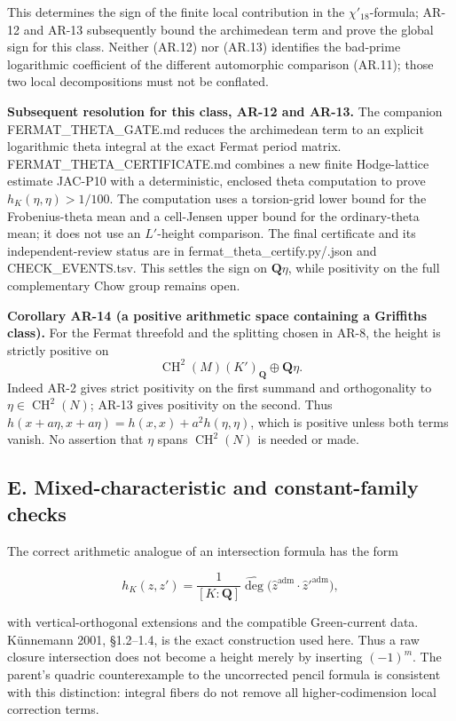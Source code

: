 \documentclass[11pt,a4paper]{article}
\begin{document}
This determines the sign of the finite local contribution in the
\(\chi'_{18}\)-formula; AR-12 and AR-13 subsequently bound the
archimedean term and prove the global sign for this class. Neither
(AR.12) nor (AR.13) identifies the bad-prime logarithmic coefficient of
the different automorphic comparison (AR.11); those two local
decompositions must not be conflated.

\textbf{Subsequent resolution for this class, AR-12 and AR-13.} The
companion FERMAT\_THETA\_GATE.md reduces the archimedean term to an
explicit logarithmic theta integral at the exact Fermat period matrix.
FERMAT\_THETA\_CERTIFICATE.md combines a new finite Hodge-lattice
estimate JAC-P10 with a deterministic, enclosed theta computation to
prove \(h_K(\eta,\eta)>1/100\). The computation uses a torsion-grid
lower bound for the Frobenius-theta mean and a cell-Jensen upper bound
for the ordinary-theta mean; it does not use an \(L'\)-height
comparison. The final certificate and its independent-review status are
in fermat\_theta\_certify.py/.json and CHECK\_EVENTS.tsv. This settles
the sign on \(\mathbf Q\eta\), while positivity on the full
complementary Chow group remains open.

\textbf{Corollary AR-14 (a positive arithmetic space containing a
Griffiths class).} For the Fermat threefold and the splitting chosen in
AR-8, the height is strictly positive on \[
\operatorname{CH}^2(M)(K')_{\mathbf Q}\oplus\mathbf Q\eta.
\] Indeed AR-2 gives strict positivity on the first summand and
orthogonality to \(\eta\in\operatorname{CH}^2(N)\); AR-13 gives
positivity on the second. Thus
\(h(x+a\eta,x+a\eta)=h(x,x)+a^2h(\eta,\eta)\), which is positive unless
both terms vanish. No assertion that \(\eta\) spans
\(\operatorname{CH}^2(N)\) is needed or made.

\subsection{E. Mixed-characteristic and constant-family
checks}\label{e.-mixed-characteristic-and-constant-family-checks}

The correct arithmetic analogue of an intersection formula has the form

\[
h_K(z,z')=\frac1{[K:\mathbf Q]}\widehat{\deg}
 \bigl(\widehat z^{\mathrm{adm}}\cdot\widehat z'^{\mathrm{adm}}\bigr),
\tag{AR.6}
\]

with vertical-orthogonal extensions and the compatible Green-current
data. Künnemann 2001, §1.2--1.4, is the exact construction used here.
Thus a raw closure intersection does not become a height merely by
inserting \((-1)^m\). The parent's quadric counterexample to the
uncorrected pencil formula is consistent with this distinction: integral
fibers do not remove all higher-codimension local correction terms.
\end{document}
